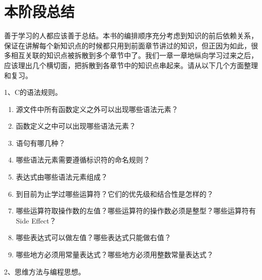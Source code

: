 

\chapter{本阶段总结}
%
善于学习的人都应该善于总结。本书的编排顺序充分考虑到知识的前后依赖关系，保证在讲解每个新知识点的时候都只用到前面章节讲过的知识，但正因为如此，很多相互关联的知识点被拆散到多个章节中了。我们一章一章地纵向学习过来之后，应该理出几个横切面，把拆散到各章节中的知识点串起来。请从以下几个方面整理和复习。



1、C的语法规则。


\begin{enumerate}

\item 源文件中所有函数定义之外可以出现哪些语法元素？

\item 函数定义之中可以出现哪些语法元素？

\item 语句有哪几种？

\item 哪些语法元素需要遵循标识符的命名规则？

\item 表达式由哪些语法元素组成？

\item 到目前为止学过哪些运算符？它们的优先级和结合性是怎样的？

\item 哪些运算符取操作数的左值？哪些运算符的操作数必须是整型？哪些运算符有Side Effect？

\item 哪些表达式可以做左值？哪些表达式只能做右值？

\item 哪些地方必须用常量表达式？哪些地方必须用整数常量表达式？
\end{enumerate}


2、思维方法与编程思想。


